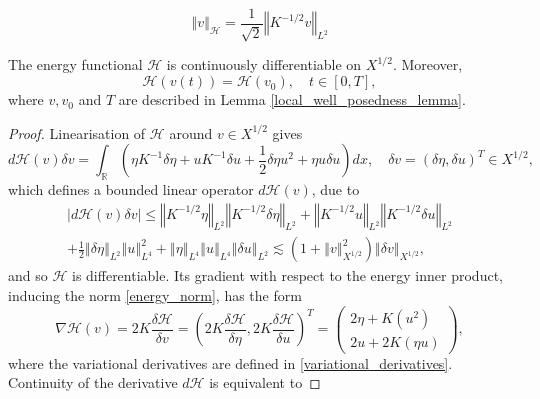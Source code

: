 \documentclass[10pt,a4paper]{amsart}
\newcommand{\Abs}[1]{\left\vert #1 \right\vert}
\newcommand{\R}{\mathbb{R}}
\newcommand{\norm}[1]{\left\Vert #1 \right\Vert}
\begin{document}
\begin{equation}
\label{energy_norm}
    \norm{v}_{\mathcal H}
    =
    \frac 1{\sqrt 2}
    \norm{K^{-1/2} v}_{L^2}
\end{equation}

\begin{lemma}
The energy functional $\mathcal H$ is continuously differentiable on $X^{1/2}$.
Moreover,
\[
    \mathcal H(v(t))
    =
    \mathcal H(v_0)
    , \quad
    t \in [0, T],
\]
where $v, v_0$ and $T$ are described in Lemma \ref{local_well_posedness_lemma}.
\end{lemma}

\begin{proof}
%
Linearisation of $\mathcal H$ around $v \in X^{1/2}$
gives
\[
    d \mathcal H(v) \delta v
    =
	\int_\R
	\left(
		\eta K^{-1} \delta \eta
		+
        u K^{-1} \delta u
		+
        \frac 12 \delta \eta u^2
        +
        \eta u \delta u
	\right)
	dx
    , \quad
    \delta v = ( \delta \eta, \delta u )^T \in X^{1/2}
    ,
\]
which defines a bounded linear operator $d \mathcal H(v)$,
due to
\begin{multline*}
    \Abs{d \mathcal H(v) \delta v}
    \leqslant
    \norm{
		K^{-1/2} \eta
    }_{L^2}
    \norm{
        K^{-1/2} \delta \eta
    }_{L^2}
    +
    \norm{
        K^{-1/2} u
    }_{L^2}
    \norm{
        K^{-1/2} \delta u
    }_{L^2}
    \\
    +
    \frac 12
    \norm{
        \delta \eta
    }_{L^2}
    \norm{
        u
    }_{L^4}^2
    +
    \norm{
        \eta
    }_{L^4}
    \norm{
        u
    }_{L^4}
    \norm{
        \delta u
    }_{L^2}
    \lesssim
    \left(
        1 + \norm{v}_{X^{1/2}}^2
    \right)
    \norm{\delta v}_{X^{1/2}}
    ,
\end{multline*}
and so $\mathcal H$ is differentiable.
Its gradient with respect to the energy inner product, inducing the norm \eqref{energy_norm},
has the form
\[
    \nabla \mathcal H(v)
    =
    2 K
    \frac{ \delta \mathcal H }{ \delta v }
    =
    \left(
        2 K
        \frac{ \delta \mathcal H }{ \delta \eta }
        ,
        2 K
        \frac{ \delta \mathcal H }{ \delta u }
    \right)^T
    =
    \begin{pmatrix}
        2 \eta + K \left( u^2 \right)
        \\
        2 u + 2 K \left( \eta u \right)
    \end{pmatrix}
    ,
\]
where the variational derivatives are defined in \eqref{variational_derivatives}.
Continuity of the derivative $d \mathcal H$ is equivalent to

\end{proof}
\end{document}
